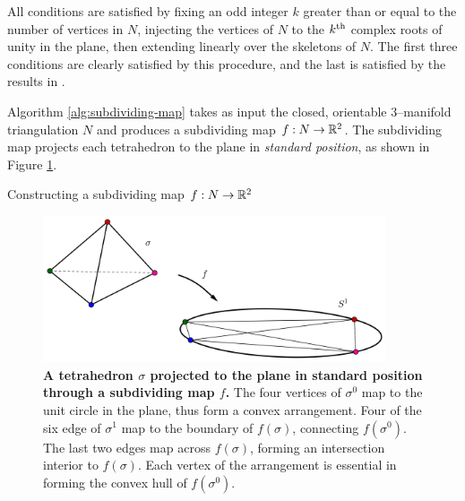All conditions are satisfied by fixing an odd integer $k$ greater than or equal to the number of vertices in $N$, injecting the vertices of $N$ to the $k^{\text{th}}$ complex roots of unity in the plane, then extending linearly over the skeletons of $N$.
The first three conditions are clearly satisfied by this procedure, and the last is satisfied by the results in \cite{PoonRub98}.

Algorithm \ref{alg:subdividing-map} takes as input the closed, orientable 3--manifold triangulation $N$ and produces a subdividing map $f:N\to\mathbb{R}^2$.
The subdividing map projects each tetrahedron to the plane in \emph{standard position}, as shown in Figure \ref{fig:standard-position}.



\begin{algorithm}
	\caption{Constructing a subdividing map $f:N\to\mathbb{R}^2$}
	\label{alg:subdividing-map}
\end{algorithm}


\begin{figure}[h!]
	\centering
	\includegraphics[width=0.9\textwidth]{figures/standard-position.png}
	\caption{
		\textbf{A tetrahedron $\sigma$ projected to the plane in standard position through a subdividing map $f$.}
		The four vertices of $\sigma^0$ map to the unit circle in the plane, thus form a convex arrangement.
		Four of the six edge of $\sigma^1$ map to the boundary of $f(\sigma)$, connecting $f(\sigma^0)$.
		The last two edges map across $f(\sigma)$, forming an intersection interior to $f(\sigma)$.
		Each vertex of the arrangement is essential in forming the convex hull of $f(\sigma^0)$.
	}
	\label{fig:standard-position}
\end{figure}